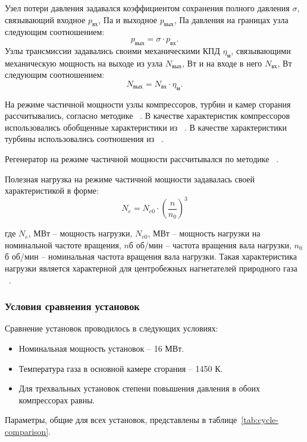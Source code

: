 Узел потери давления задавался коэффициентом сохранения полного давления $\sigma$, связывающий входное $p_{вх}$, Па и выходное $p_{вых}$, Па давления на границах узла следующим соотношением:
$$
	p_{вых} = \sigma \cdot p_{вх}.
$$
Узлы трансмиссии задавались своими механическими КПД $\eta_м$, связывающими механическую мощность на выходе из узла $N_{вых}$, Вт и на входе в него $N_{вх}$, Вт следующим соотношением:
$$
	N_{вых} = N_{вх} \cdot \eta_м.
$$

На режиме частичной мощности узлы компрессоров, турбин и камер сгорания рассчитывались, согласно методике ~\cite{shlyakhtenko}.
В качестве характеристик компрессоров использовались обобщенные характеристики из ~\cite{comp_char}.
В качестве характеристики турбины использовались соотношения из ~\cite{kazandjan}.

Регенератор на режиме частичной мощности рассчитывался по методике ~\cite{heat_exchangers}.

Полезная нагрузка на режиме частичной мощности задавалась своей характеристикой в форме:
$$
	N_e = N_{e0} \cdot \left( \frac{n}{n_0} \right)^3
$$

где $N_e$, МВт – мощность нагрузки, $N_{e0}$, МВт – мощность нагрузки на номинальной частоте вращения,  $n$б об/мин –
частота вращения вала нагрузки, $n_0$б об/мин – номинальная частота вращения вала нагрузки. Такая характеристика нагрузки
является характерной для центробежных нагнетателей природного газа ~\cite{radial_compressors}.

\subsubsection{Условия сравнения установок}

Сравнение установок проводилось в следующих условиях:
\begin{itemize}
	\item Номинальная мощность установок – 16 МВт.
	\item Температура газа в основной камере сгорания – 1450 К.
	\item Для трехвальных установок степени повышения давления в обоих компрессорах равны.
\end{itemize}

Параметры, общие для всех установок, представлены в таблице~\ref{tab:cycle-comparison}.

